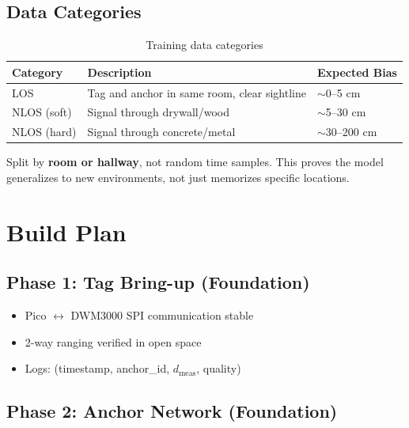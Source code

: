 \documentclass[11pt,a4paper]{article}
\begin{document}
\subsection{Data Categories}

\begin{table}[H]
\centering
\begin{tabular}{@{}lll@{}}
\toprule
\textbf{Category} & \textbf{Description} & \textbf{Expected Bias} \\
\midrule
LOS & Tag and anchor in same room, clear sightline & $\sim$0--5 cm \\
NLOS (soft) & Signal through drywall/wood & $\sim$5--30 cm \\
NLOS (hard) & Signal through concrete/metal & $\sim$30--200 cm \\
\bottomrule
\end{tabular}
\caption{Training data categories}
\end{table}

\begin{notebox}
Split by \textbf{room or hallway}, not random time samples. This proves the model generalizes to new environments, not just memorizes specific locations.
\end{notebox}

\section{Build Plan}

\subsection{Phase 1: Tag Bring-up (Foundation)}

\begin{itemize}
    \item[$\square$] Pico $\leftrightarrow$ DWM3000 SPI communication stable
    \item[$\square$] 2-way ranging verified in open space
    \item[$\square$] Logs: (timestamp, anchor\_id, $d_{\text{meas}}$, quality)
\end{itemize}

\subsection{Phase 2: Anchor Network (Foundation)}
\end{document}
